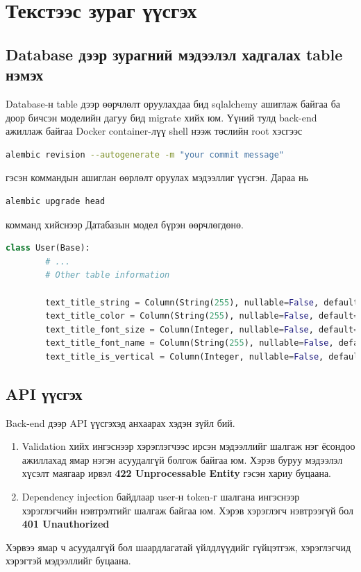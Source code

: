 \section{Текстээс зураг үүсгэх}
\subsection{Database дээр зурагний мэдээлэл хадгалах table нэмэх}
Database-н table дээр өөрчлөлт оруулахдаа бид sqlalchemy ашиглаж байгаа ба доор бичсэн моделийн дагуу бид migrate хийх юм. Үүний тулд back-end ажиллаж байгаа Docker container-лүү shell нээж төслийн root хэсгээс
\begin{lstlisting}[language=bash]
	alembic revision --autogenerate -m "your commit message"
\end{lstlisting}
гэсэн коммандын ашиглан өөрлөлт оруулах мэдээллиг үүсгэн. Дараа нь
\begin{lstlisting}[language=bash]
	alembic upgrade head
\end{lstlisting}
комманд хийснээр Датабазын модел бүрэн өөрчлөгдөнө.

\begin{lstlisting}[language=Python,caption={Table-рүү оруулсан өөрчлөлт},frame=single]
	class User(Base):
		# ...
		# Other table information

		text_title_string = Column(String(255), nullable=False, default="")
		text_title_color = Column(String(255), nullable=False, default="#000000")
		text_title_font_size = Column(Integer, nullable=False, default=0)
		text_title_font_name = Column(String(255), nullable=False, default="")
		text_title_is_vertical = Column(Integer, nullable=False, default=0)
	\end{lstlisting}

\subsection{API үүсгэх}
Back-end дээр API үүсгэхэд анхаарах хэдэн зүйл бий.
\begin{enumerate}
	\item Validation хийх ингэснээр хэрэглэгчээс ирсэн мэдээллийг шалгаж нэг ёсондоо ажиллахад  ямар нэгэн асуудалгүй болгож байгаа юм. Хэрэв буруу мэдээлэл хүсэлт маягаар ирвэл \textbf{
		      422 Unprocessable Entity}
	      гэсэн хариу буцаана.

	\item Dependency injection байдлаар user-н token-г шалгана ингэснээр хэрэглэгчийн нэвтрэлтийг шалгаж байгаа юм. Хэрэв хэрэглэгч нэвтрээгүй бол \textbf{
		      401 Unauthorized}


\end{enumerate}
Хэрвээ ямар ч асуудалгүй бол шаардлагатай үйлдлүүдийг гүйцэтгэж, хэрэглэгчид хэрэгтэй мэдээллийг буцаана.
